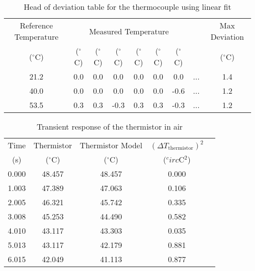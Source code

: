 \begin{table}[h]
    \centering
    \caption{Head of deviation table for the thermocouple using linear fit}
    \label{tab:thermocouple_calibration_deviation_linear}
    \begin{tabular}{ccccccccc}
        \toprule
        Reference Temperature & \multicolumn{6}{c}{Measured Temperature} &  & Max Deviation \\
        \cmidrule{2-7}
        ($^\circ$C) & ($^\circ$C) & ($^\circ$C) & ($^\circ$C) & ($^\circ$C) & ($^\circ$C) & ($^\circ$C) &  & ($^\circ$C) \\
        \midrule
        21.2 & 0.0 & 0.0 & 0.0 & 0.0 & 0.0 & 0.0 &  ... & 1.4 \\
        40.0 & 0.0 & 0.0 & 0.0 & 0.0 & 0.0 & -0.6 &  ... & 1.2 \\
        53.5 & 0.3 & 0.3 & -0.3 & 0.3 & 0.3 & -0.3 &  ... & 1.2 \\
        \bottomrule
    \end{tabular}
\end{table}


\begin{table}
    \centering
    \caption{Transient response of the thermistor in air}
    \label{tab:thermistor_transient_air}
    \begin{tabular}{ccccc}
        \toprule
        Time & Thermistor  & Thermistor Model  & $(\Delta T_{\text{thermistor}})^2$ \\
        (s) & ($^\circ$C) & ($^\circ$C) & ($^circ$C$^2$)\\
        \midrule
        0.000 & 48.457 & 48.457 & 0.000 \\
        1.003 & 47.389 & 47.063 & 0.106 \\
        2.005 & 46.321 & 45.742 & 0.335 \\
        3.008 & 45.253 & 44.490 & 0.582 \\
        4.010 & 43.117 & 43.303 & 0.035 \\
        5.013 & 43.117 & 42.179 & 0.881 \\
        6.015 & 42.049 & 41.113 & 0.877 \\
        \bottomrule
    \end{tabular}
\end{table}

